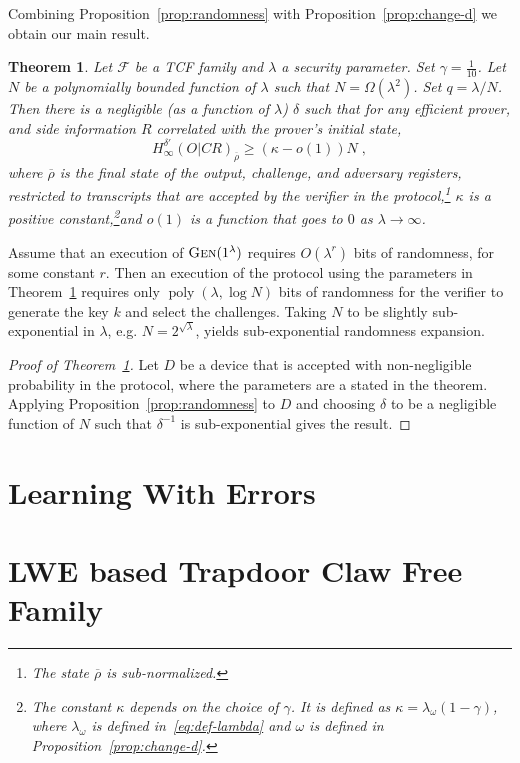 \documentclass[11pt]{article}
\newtheorem{theorem}{Theorem}
\theoremstyle{remark}
\theoremstyle{definition}
\newcommand{\ol}[1]{\overline{#1}}
\DeclareMathOperator{\poly}{poly}
\newcommand{\Gen}{\textsc{Gen}}
\newcommand{\Hmin}{H_\infty}
\begin{document}
Combining Proposition~\ref{prop:randomness} with Proposition~\ref{prop:change-d} we obtain our main result.


\begin{theorem}\label{thm:expansion}
Let $\mathcal{F}$ be a TCF family and $\lambda$ a security parameter. Set $\gamma = \frac{1}{10}$. Let $N$ be a polynomially bounded function of $\lambda$ such that $N = \Omega(\lambda^2)$. Set $q = \lambda/N$. Then there is a negligible (as a function of $\lambda$) $\delta$ such that for any efficient prover, and side information $R$ correlated with the prover's initial state,
$$\Hmin^{\delta'}(O|CR)_{\ol{\rho}} \geq  (\kappa-o(1)) N\;,$$
where $\ol{\rho}$ is the final state of the output, challenge, and adversary registers, restricted to transcripts that are accepted by the verifier in the protocol,\footnote{The state $\ol{\rho}$ is sub-normalized.} $\kappa$ is a positive constant,\footnote{The constant $\kappa$ depends on the choice of $\gamma$. It is defined as $\kappa =\lambda_\omega(1-\gamma)$, where $\lambda_\omega$ is defined in~\eqref{eq:def-lambda} and $\omega$ is defined in Proposition~\ref{prop:change-d}.}and $o(1)$ is a function that goes to $0$ as $\lambda\to\infty$. 
\end{theorem}

Assume that an execution of $\Gen(1^\lambda)$ requires $O(\lambda^r)$ bits of randomness, for some constant $r$. Then an execution of the protocol using the parameters in Theorem~\ref{thm:expansion} requires only $\poly(\lambda,\log N)$ bits of randomness for the verifier to generate the key $k$ and select the challenges. Taking $N$ to be slightly sub-exponential in $\lambda$, e.g. $N=2^{\sqrt{\lambda}}$, yields sub-exponential randomness expansion. 

\begin{proof}[Proof of Theorem~\ref{thm:expansion}]
Let $D$ be a device that is accepted with non-negligible probability in the protocol, where the parameters are a stated in the theorem. Applying Proposition~\ref{prop:randomness} to $D$ and choosing $\delta$ to be a negligible function of $N$ such that $\delta^{-1}$ is sub-exponential gives the result. 
\end{proof}

\appendix

\section{Learning With Errors}
\label{sec:lweprelim}



\section{LWE based Trapdoor Claw Free Family}
\label{sec:lwetcf}





\notesendofpaper
\end{document}
